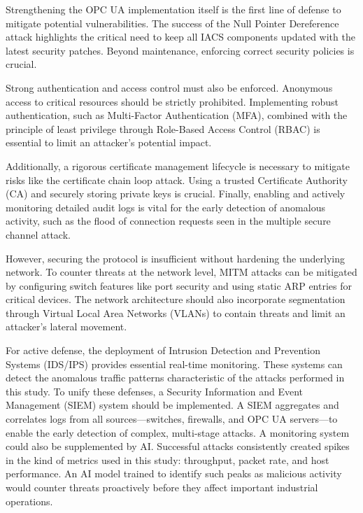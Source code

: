 \documentclass[pdflatex,sn-mathphys-num,iicol]{sn-jnl}%
\begin{document}
Strengthening the OPC UA implementation itself is the first line of defense to mitigate potential vulnerabilities. The success of the Null Pointer Dereference attack highlights the critical need to keep all IACS components updated with the latest security patches. Beyond maintenance, enforcing correct security policies is crucial. %

Strong authentication and access control must also be enforced. Anonymous access to critical resources should be strictly prohibited. Implementing robust authentication, such as Multi-Factor Authentication (MFA), combined with the principle of least privilege through Role-Based Access Control (RBAC) is essential to limit an attacker's potential impact.

Additionally, a rigorous certificate management lifecycle is necessary to mitigate risks like the certificate chain loop attack. Using a trusted Certificate Authority (CA) and securely storing private keys is crucial. Finally, enabling and actively monitoring detailed audit logs is vital for the early detection of anomalous activity, such as the flood of connection requests seen in the multiple secure channel attack.

However, securing the protocol is insufficient without hardening the underlying network. To counter threats at the network level, MITM attacks can be mitigated by configuring switch features like port security and using static ARP entries for critical devices. The network architecture should also incorporate segmentation through Virtual Local Area Networks (VLANs) to contain threats and limit an attacker's lateral movement.

For active defense, the deployment of Intrusion Detection and Prevention Systems (IDS/IPS) provides essential real-time monitoring. These systems can detect the anomalous traffic patterns characteristic of the attacks performed in this study. To unify these defenses, a Security Information and Event Management (SIEM) system should be implemented. A SIEM aggregates and correlates logs from all sources—switches, firewalls, and OPC UA servers—to enable the early detection of complex, multi-stage attacks. A monitoring system could also be supplemented by AI. Successful attacks consistently created spikes in the kind of metrics used in this study: throughput, packet rate, and host performance. An AI model trained to identify such peaks as malicious activity would counter threats proactively before they affect important industrial operations. %
\end{document}
